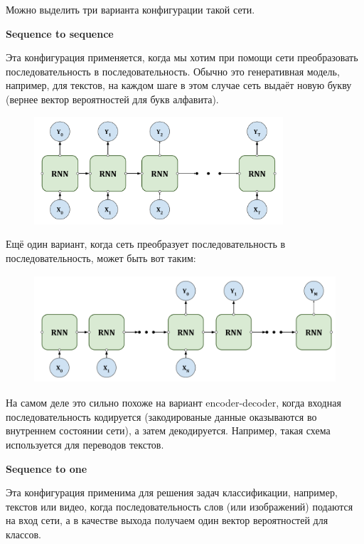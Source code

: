\documentclass[a4paper,russian]{article}
\begin{document}
	Можно выделить три варианта конфигурации такой сети.
	
	\textbf{Sequence to sequence}
	
	Эта конфигурация применяется, когда мы хотим при помощи сети преобразовать последовательность в последовательность. Обычно это генеративная модель, например, для текстов, на каждом шаге в этом случае сеть выдаёт новую букву (вернее вектор вероятностей для букв алфавита).
	
	\begin{figure}[ht!]
		\centering
		\captionsetup{justification=centering}
		\includegraphics[height=40mm]{img/rnn_seq_to_seq.png}
	\end{figure}

	Ещё один вариант, когда сеть преобразует последовательность в последовательность, может быть вот таким:
	
	\begin{figure}[ht!]
		\centering
		\captionsetup{justification=centering}
		\includegraphics[height=40mm]{img/rnn_seq_to_seq_v2.png}
	\end{figure}
	
	На самом деле это сильно похоже на вариант encoder-decoder, когда входная последовательность кодируется (закодированые данные оказываются во внутреннем состоянии сети), а затем декодируется. Например, такая схема используется для переводов текстов.
	
	\textbf{Sequence to one}
	
	Эта конфигурация применима для решения задач классификации, например, текстов или видео, когда последовательность слов (или изображений) подаются на вход сети, а в качестве выхода получаем один вектор вероятностей для классов.
	
\end{document}
